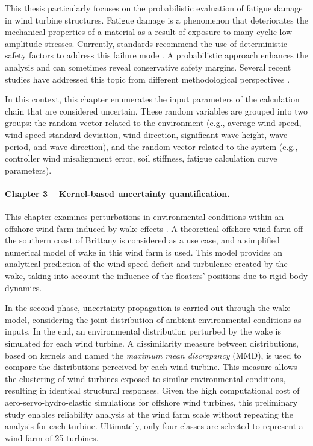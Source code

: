 This thesis particularly focuses on the probabilistic evaluation of fatigue damage in wind turbine structures. 
Fatigue damage is a phenomenon that deteriorates the mechanical properties of a material as a result of exposure to many cyclic low-amplitude stresses. 
Currently, standards recommend the use of deterministic safety factors to address this failure mode \citep{iec_2019,dnv_loads_2016}. 
A probabilistic approach enhances the analysis and can sometimes reveal conservative safety margins. 
Several recent studies have addressed this topic from different methodological perspectives \citep{huchet_2019,lataniotis_2019,cousin_2021,hirvoas_2021,petrovska_2022}.

In this context, this chapter enumerates the input parameters of the calculation chain that are considered uncertain. 
These random variables are grouped into two groups: the random vector related to the environment (e.g., average wind speed, wind speed standard deviation, wind direction, significant wave height, wave period, and wave direction), 
and the random vector related to the system (e.g., controller wind misalignment error, soil stiffness, fatigue calculation curve parameters).


\paragraph{Chapter 3 -- Kernel-based uncertainty quantification.} 
This chapter examines perturbations in environmental conditions within an offshore wind farm induced by wake effects \citep{larsen_2008_wake}. 
A theoretical offshore wind farm off the southern coast of Brittany is considered as a use case, and a simplified numerical model of wake in this wind farm is used. 
This model provides an analytical prediction of the wind speed deficit and turbulence created by the wake, taking into account the influence of the floaters' positions due to rigid body dynamics. 

In the second phase, uncertainty propagation is carried out through the wake model, considering the joint distribution of ambient environmental conditions as inputs. 
In the end, an environmental distribution perturbed by the wake is simulated for each wind turbine. 
A dissimilarity measure between distributions, based on kernels and named the \textit{maximum mean discrepancy} (MMD), is used to compare the distributions perceived by each wind turbine. 
This measure allows the clustering of wind turbines exposed to similar environmental conditions, resulting in identical structural responses. 
Given the high computational cost of aero-servo-hydro-elastic simulations for offshore wind turbines, this preliminary study enables reliability analysis at the wind farm scale without repeating the analysis for each turbine. 
Ultimately, only four classes are selected to represent a wind farm of 25 turbines.


